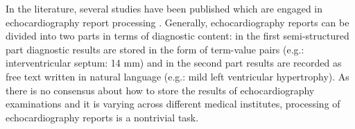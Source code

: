 

In the literature, several studies have been published which are engaged in echocardiography report processing \cite{xie2017extracting, garvin2012automated, kim2017extraction, patterson2017unlocking, wells2014extraction, toepfer2015fine, jonnalagadda2017text, renganathan2017text}. Generally, echocardiography reports can be divided into two parts in terms of diagnostic content: in the first semi-structured part diagnostic results are stored in the form of term-value pairs (e.g.: interventricular septum: 14 mm) and in the second part results are recorded as free text written in natural language (e.g.: mild left ventricular hypertrophy). As there is no consensus about how to store the results of echocardiography examinations and it is varying across different medical institutes, processing of echocardiography reports is a nontrivial task.


